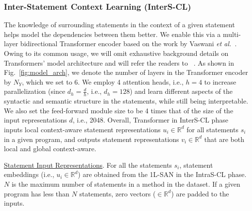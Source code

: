 \vspace{2pt}
\subsubsection{\bf Inter-Statement Context Learning (InterS-CL)}
The knowledge of surrounding statements in the context of a given
statement helps \tool model the dependencies between them better. We
enable this via a multi-layer bidirectional Transformer encoder based
on the work by Vaswani {\em et
  al.}~\cite{Vaswani-2017}. Owing to its common usage, we will omit
exhaustive background details on Transformers' model architecture and
will refer the readers to ~\cite{Vaswani-2017}. As shown in
Fig.~\ref{fig:model_arch}, we denote the number of layers in the
Transformer encoder by $N_Y$, which we set to 6. We employ 4 attention
heads, i.e., $h$$=$$4$ to increase parallelization (since
$d_h$$=$$\frac{d}{h}$, i.e., $d_h$$=$$128$) and learn different
aspects of the syntactic and semantic structure in the statements,
while still being interpretable. We also set the feed-forward module
size to be 4 times that of the size of the input representations $d$,
i.e., 2048. Overall, Transformer in InterS-CL phase inputs
local context-aware statement representations $u_i \in \mathbb{R}^d$
for all statements $s_i$ in a given program, and outputs statement
representations $v_i \in \mathbb{R}^d$ that are both local and global
context-aware.

\vspace{1pt} \underline{Statement Input Representations}. For all the
statements $s_i$, statement embeddings (i.e., $u_i \in
\mathbb{R}^d$) are obtained from the 1L-SAN in the IntraS-CL phase.
$N$ is the maximum number of statements in a method in the dataset. If
a given program has less than $N$ statements,
zero vectors ($\in \mathbb{R}^d$) are padded to the inputs.



